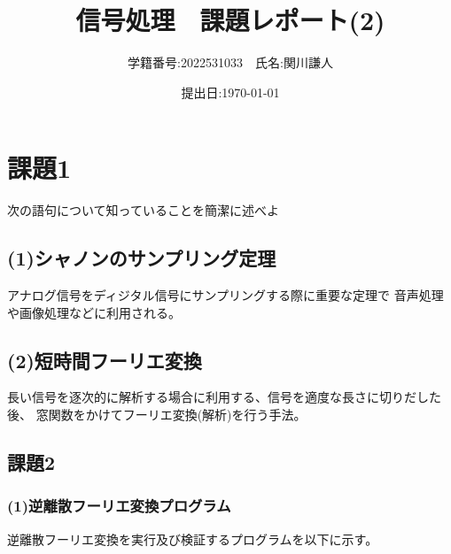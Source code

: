 \documentclass[a4paper,11pt]{ltjsarticle}
\begin{document}
\title{信号処理　課題レポート(2)}
\author{学籍番号:2022531033　氏名:関川謙人}
\date{提出日:\today}
\maketitle

\section*{課題1}
次の語句について知っていることを簡潔に述べよ
\subsection*{(1)シャノンのサンプリング定理}
アナログ信号をディジタル信号にサンプリングする際に重要な定理で
音声処理や画像処理などに利用される。
\subsection*{(2)短時間フーリエ変換}
長い信号を逐次的に解析する場合に利用する、信号を適度な長さに切りだした後、
窓関数をかけてフーリエ変換(解析)を行う手法。
\subsection*{課題2}
\subsubsection*{(1)逆離散フーリエ変換プログラム}
逆離散フーリエ変換を実行及び検証するプログラムを以下に示す。

\end{document}
